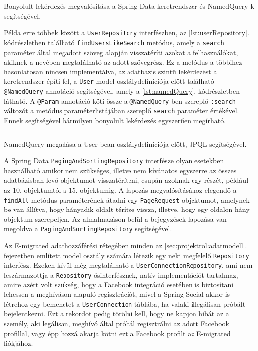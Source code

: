 \begin{listing}
  \inputminted{java}{progfiles/UserRepository.java}
  \caption{Bonyolult lekérdezés megvalósítása a Spring Data keretrendszer és NamedQuery-k segítségével.}
  \label{lst:userRepository}
\end{listing}


Példa erre többek között a \texttt{UserRepository} interfészben, az \ref{lst:userRepository}. kódrészletben található \texttt{findUsersLikeSearch} metódus, amely a \texttt{search} paraméter által megadott szöveg alapján visszatéríti azokat a felhasználókat, akiknek a nevében megtalálható az adott szövegrész. Ez a metódus a többihez hasonlatosan nincsen implementálva, az adatbázis szintű lekérdezést a keretrendszer építi fel, a \texttt{User} model osztálydefiníciója előtt található \texttt{@NamedQuery} annotáció segítségével, amely a \ref{lst:namedQuery}. kódrészletben látható. A \texttt{@Param} annotáció köti össze a \texttt{@NamedQuery}-ben szereplő \texttt{:search} változót a metódus paraméterlistájában szereplő \texttt{search} paraméter értékével. Ennek segítségével bármilyen bonyolult lekérdezés egyszerűen megírható. 

\begin{listing}
  \inputminted[fontsize=\small]{java}{progfiles/UserNamedQuery.java}
  \caption{NamedQuery megadása a User bean osztálydefiníciója előtt, JPQL segítségével.}
  \label{lst:namedQuery}
\end{listing}

A Spring Data \texttt{PagingAndSortingRepository} interfésze olyan esetekben használható amikor nem szükséges, illetve nem kívánatos egyszerre az összes adatbázisban levő objektumot visszatéríteni, csupán azoknak egy részét, például az 10. objektumtól a 15. objektumig. A lapozás megvalósításához elegendő a \texttt{findAll} metódus paraméterének átadni egy \texttt{PageRequest} objektumot, amelynek be van állítva, hogy hányadik oldalt térítse vissza, illetve, hogy egy oldalon hány objektum szerepeljen. Az almalmazáson belül a bejegyzések lapozása van megoldva a \texttt{PagingAndSortingRepository} segítségével.

Az E-migrated adathozzáférési rétegében minden az  \ref{sec:projektrol:adatmodell}. fejezetben említett model osztály  számára létezik egy neki megfelelő \texttt{Repository} interfész. Ezeken kívül még megtalálható a \texttt{UserConnectionRepository}, ami nem leszármazottja a \texttt{Repository} ősinterfésznek, natív implementációt tartalmaz, amire azért volt szükség, hogy a Facebook integráció esetében is biztosítani lehessen a meghíváson alapuló regisztrációt, mivel a Spring Social akkor is létrehoz egy bemenetet a \texttt{UserConnection} táblába, ha valaki illegálisan próbált bejelentkezni. Ezt a rekordot pedig törölni kell, hogy ne kapjon hibát az a személy, aki legálisan, meghívó által próbál regisztrálni az adott Facebook profillal, vagy épp hozzá akarja kötni ezt a Facebook profilt az E-migrated fiókjához.


